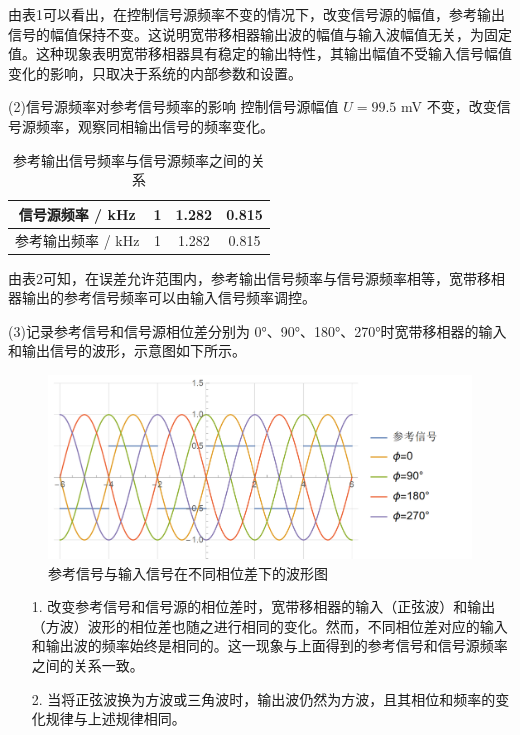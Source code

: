 \documentclass[12pt,a4paper]{article}
\begin{document}
由表1可以看出，在控制信号源频率不变的情况下，改变信号源的幅值，参考输出信号的幅值保持不变。这说明宽带移相器输出波的幅值与输入波幅值无关，为固定值。这种现象表明宽带移相器具有稳定的输出特性，其输出幅值不受输入信号幅值变化的影响，只取决于系统的内部参数和设置。

(2)信号源频率对参考信号频率的影响
控制信号源幅值 $U = 99.5$ mV 不变，改变信号源频率，观察同相输出信号的频率变化。

\begin{table}[h]
    \centering
    \caption{参考输出信号频率与信号源频率之间的关系}
    \begin{tabular}{cccc}
        \toprule
        信号源频率 / kHz & 1 & 1.282 & 0.815 \\
        \midrule
        参考输出频率 / kHz & 1& 1.282 & 0.815  \\
        \bottomrule
    \end{tabular}
\end{table}

由表2可知，在误差允许范围内，参考输出信号频率与信号源频率相等，宽带移相器输出的参考信号频率可以由输入信号频率调控。

(3)记录参考信号和信号源相位差分别为 0°、90°、180°、270°时宽带移相器的输入和输出信号的波形，示意图如下所示。
\begin{figure}[H]
    \centering
    \includegraphics[width=\textwidth]{参考信号相位.png}
    \caption{参考信号与输入信号在不同相位差下的波形图}
    \label{fig:reference-signal-phase}
    \end{figure}

\begin{enumerate}
    \item[1.] 改变参考信号和信号源的相位差时，宽带移相器的输入（正弦波）和输出（方波）波形的相位差也随之进行相同的变化。然而，不同相位差对应的输入和输出波的频率始终是相同的。这一现象与上面得到的参考信号和信号源频率之间的关系一致。
    
    \item[2.] 当将正弦波换为方波或三角波时，输出波仍然为方波，且其相位和频率的变化规律与上述规律相同。
\end{enumerate}
\end{document}
